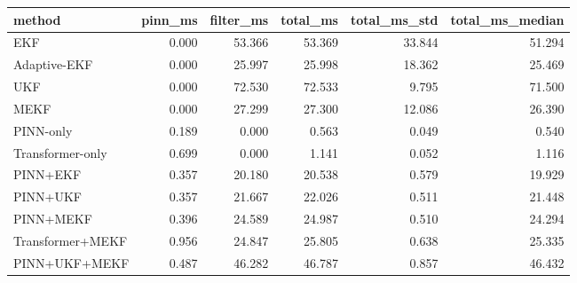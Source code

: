 \begin{tabular}{lrrrrr}
\toprule
method & pinn_ms & filter_ms & total_ms & total_ms_std & total_ms_median \\
\midrule
EKF & 0.000 & 53.366 & 53.369 & 33.844 & 51.294 \\
Adaptive-EKF & 0.000 & 25.997 & 25.998 & 18.362 & 25.469 \\
UKF & 0.000 & 72.530 & 72.533 & 9.795 & 71.500 \\
MEKF & 0.000 & 27.299 & 27.300 & 12.086 & 26.390 \\
PINN-only & 0.189 & 0.000 & 0.563 & 0.049 & 0.540 \\
Transformer-only & 0.699 & 0.000 & 1.141 & 0.052 & 1.116 \\
PINN+EKF & 0.357 & 20.180 & 20.538 & 0.579 & 19.929 \\
PINN+UKF & 0.357 & 21.667 & 22.026 & 0.511 & 21.448 \\
PINN+MEKF & 0.396 & 24.589 & 24.987 & 0.510 & 24.294 \\
Transformer+MEKF & 0.956 & 24.847 & 25.805 & 0.638 & 25.335 \\
PINN+UKF+MEKF & 0.487 & 46.282 & 46.787 & 0.857 & 46.432 \\
\bottomrule
\end{tabular}
